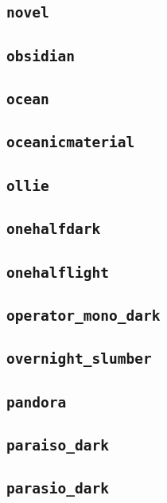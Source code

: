 \subsection{\texttt{novel}}
\newpage
\subsection{\texttt{obsidian}}
\newpage
\subsection{\texttt{ocean}}
\newpage
\subsection{\texttt{oceanicmaterial}}
\newpage
\subsection{\texttt{ollie}}
\newpage
\subsection{\texttt{onehalfdark}}
\newpage
\subsection{\texttt{onehalflight}}
\newpage
\subsection{\texttt{operator\_mono\_dark}}
\newpage
\subsection{\texttt{overnight\_slumber}}
\newpage
\subsection{\texttt{pandora}}
\newpage
\subsection{\texttt{paraiso\_dark}}
\newpage
\subsection{\texttt{parasio\_dark}}
\newpage
